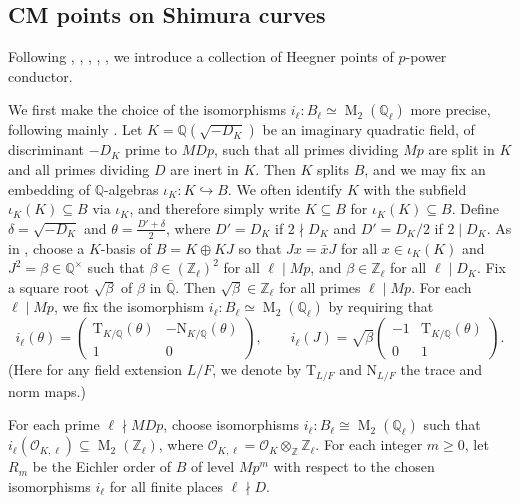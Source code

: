 \documentclass[a4paper,11pt]{amsart}
\numberwithin{equation}{section}
\theoremstyle{plain}
\theoremstyle{definition}
\theoremstyle{remark}
\newcommand{\Q}{\mathbb{Q}}
\newcommand{\Z}{\mathbb{Z}}
\DeclareMathOperator{\M}{M}
\newcommand{\mat}[4]{\left(\begin{array}{cc}#1&#2\\#3&#4\end{array}\right)}
\newcommand{\smallmat}[4]{\bigl(\begin{smallmatrix}#1&#2\\#3&#4\end{smallmatrix}\bigr)}
\begin{document}
{\subsection{CM points on Shimura curves} \label{CM section}
Following \cite{ChHs2}, \cite{ChHs1}, \cite{CH}, \cite{BCK},
\cite{CL},
we introduce a collection of Heegner points of $p$-power conductor. 

We first make the choice of the isomorphisms $i_\ell\colon B_\ell\simeq\M_2(\Q_\ell)$ more 
precise, following mainly \cite{ChHs1}.  
Let $K=\Q(\sqrt{-D_K})$ be an imaginary quadratic field, of discriminant $-D_K$ prime to $MDp$, such that all primes dividing $Mp$ are split in $K$ and all primes dividing $D$  are inert in $K$. 
Then $K$ splits $B$, and we may fix an embedding of $\Q$-algebras $\iota_K\colon K\hookrightarrow B$. 
We often identify $K$ with the subfield $\iota_K(K)\subseteq B$
via $\iota_K$, 
and therefore simply write $K\subseteq B$ for $\iota_K(K)\subseteq B$. 
Define $\delta=\sqrt{-D_K}$ and $\theta=\frac{D'+\delta}{2}$, where $D'=D_K$ if $2\nmid D_K$ and $D'=D_K/2$ if $2\mid D_K$. 
As in \cite[\S2.1]{ChHs1}, choose a $K$-basis of $B=K\oplus KJ$
so that $Jx=\bar{x}J$ for all $x\in \iota_K(K)$ 
and $J^2=\beta\in\Q^\times$ such that $\beta\in(\Z_\ell)^2$ for all $\ell\mid Mp$, 
and $\beta\in\Z_\ell$ for all $\ell\mid D_K$. Fix a square root $\sqrt{\beta}$ of $\beta$ 
in $\overline{\Q}$. Then $\sqrt{\beta}\in \Z_\ell$ for all primes $\ell\mid Mp$. 
For each $\ell\mid Mp$, 
we fix the isomorphism $i_\ell:B_\ell\simeq\M_2(\Q_\ell)$ by 
requiring that  
\begin{equation}\label{embeq}
i_\ell(\theta)=\mat {\mathrm{T}_{K/\Q}(\theta)}{-\mathrm{N}_{K/\Q}(\theta)}{1}{0}, 
\qquad i_\ell(J)=\sqrt{\beta}\mat{-1}{\mathrm{T}_{K/\Q}(\theta)}{0}{1}.\end{equation}
(Here for any field extension $L/F$, we denote by $\mathrm{T}_{L/F}$ and $\mathrm{N}_{L/F}$ the trace and norm maps.)

For each prime $\ell\nmid MDp$, choose isomorphisms $i_\ell\colon B_\ell\cong \M_2(\Q_\ell)$ such that $i_\ell(\mathcal{O}_{K,\ell})\subseteq \M_2(\Z_\ell)$, where $\mathcal{O}_{K,\ell}=\mathcal{O}_K\otimes_\Z\Z_\ell$. 
For each integer $m\geq 0$, let $R_{m}$ be the Eichler order of $B$ of level $Mp^m$ with respect to the chosen isomorphisms $i_\ell$ for all finite places $\ell\nmid D$. 

}
\end{document}

